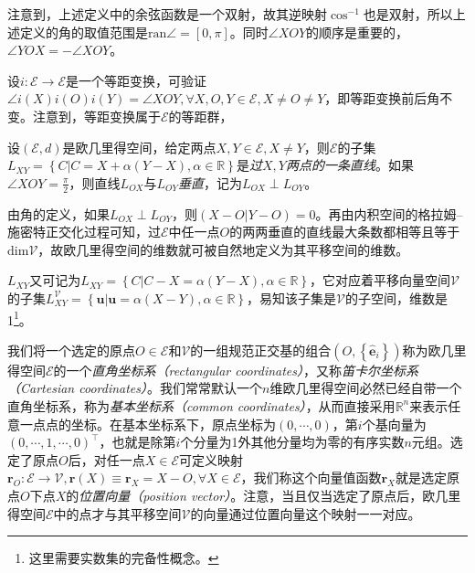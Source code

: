 \documentclass[main.tex]{subfiles}
\begin{document}
注意到，上述定义中的余弦函数是一个双射，故其逆映射$\cos^{-1}$也是双射，所以上述定义的角的取值范围是$\mathrm{ran}\angle=\left[0,\pi\right]$。同时$\angle XOY$的顺序是重要的，$\angle YOX=-\angle XOY$。


设$i:\mathcal{E}\rightarrow\mathcal{E}$是一个等距变换，可验证$\angle i\left(X\right)i\left(O\right)i\left(Y\right)=\angle XOY,\forall X,O,Y\in\mathcal{E},X\neq O\neq Y$，即等距变换前后角不变。注意到，等距变换属于$\mathcal{E}$的等距群，

\begin{definition}[过两点的直线]\label{def:II.3.7}
    设$\left(\mathcal{E},d\right)$是欧几里得空间，给定两点$X,Y\in\mathcal{E},X\neq Y$，则$\mathcal{E}$的子集$L_{XY}=\left\{C|C=X+\alpha\left(Y-X\right),\alpha\in\mathbb{R}\right\}$是\emph{过}$X,Y$\emph{两点的一条直线}。如果$\angle XOY=\frac{\pi}{2}$，则直线$L_{OX}$与$L_{OY}$\emph{垂直}，记为$L_{OX}\perp L_{OY}$。
\end{definition}

由角的定义，如果$L_{OX}\perp L_{OY}$，则$\left(X-O|Y-O\right)=0$。再由内积空间的格拉姆--施密特正交化过程可知，过$\mathcal{E}$中任一点$O$的两两垂直的直线最大条数都相等且等于$\mathrm{dim}\mathcal{V}$，故欧几里得空间的维数就可被自然地定义为其平移空间的维数。

$L_{XY}$又可记为$L_{XY}=\left\{C|C-X=\alpha\left(Y-X\right),\alpha\in\mathbb{R}\right\}$，它对应着平移向量空间$\mathcal{V}$的子集$L^{\mathcal{V}}_{XY}=\left\{\mathbf{u}|\mathbf{u}=\alpha\left(X-Y\right),\alpha\in\mathbb{R}\right\}$，易知该子集是$\mathcal{V}$的子空间，维数是1\footnote{这里需要实数集的完备性概念。}。

我们将一个选定的原点$O\in\mathcal{E}$和$\mathcal{V}$的一组规范正交基的组合$\left(O,\left\{\mathbf{\hat{e}}_i\right\}\right)$称为欧几里得空间$\mathcal{E}$的一个\emph{直角坐标系（rectangular coordinates）}，又称\emph{笛卡尔坐标系（Cartesian coordinates）}。我们常常默认一个$n$维欧几里得空间必然已经自带一个直角坐标系，称为\emph{基本坐标系（common coordinates）}，从而直接采用$\mathbb{R}^n$来表示任意一点点的坐标。在基本坐标系下，原点坐标为$\left(0,\cdots,0\right)$，第$i$个基向量为$\left(0,\cdots,1,\cdots,0\right)^\intercal$，也就是除第$i$个分量为1外其他分量均为零的有序实数$n$元组。选定了原点$O$后，对任一点$X\in\mathcal{E}$可定义映射$\mathbf{r}_O:\mathcal{E}\rightarrow\mathcal{V},\mathbf{r}\left(X\right)\equiv\mathbf{r}_X=X-O,\forall X\in\mathcal{E}$，我们称这个向量值函数$\mathbf{r}_X$就是选定原点$O$下点$X$的\emph{位置向量（position vector）}。注意，当且仅当选定了原点后，欧几里得空间$\mathcal{E}$中的点才与其平移空间$\mathcal{V}$的向量通过位置向量这个映射一一对应。
\end{document}
